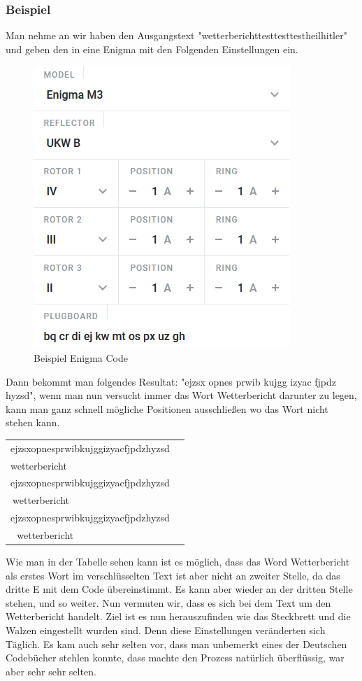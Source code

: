 \subsubsection{Beispiel}
Man nehme an wir haben den Ausgangstext "wetterberichttesttesttestheilhitler" und geben den in eine Enigma mit den Folgenden Einstellungen ein. \begin{figure}
\includegraphics[scale=0.5]{codegen.png}
\caption{Beispiel Enigma Code\cite{encoding}}
\label{fig:ecode}
\end{figure}
Dann bekommt man folgendes Resultat: "ejzsx opnes prwib kujgg izyac fjpdz hyzsd", wenn man nun versucht immer das Wort Wetterbericht darunter zu legen, kann man ganz schnell mögliche Positionen ausschließen wo das Wort nicht stehen kann.
\begin{table}[H]
\begin{tabular}{|l|l|}
\hline
ejzsxopnesprwibkujggizyacfjpdzhyzsd\\
wetterbericht\\
\hline
ejzsxopnesprwibkujggizyacfjpdzhyzsd\\
$\:$wetterbericht\\
\hline
ejzsxopnesprwibkujggizyacfjpdzhyzsd\\
$\:\:\:$wetterbericht\\
\hline
\end{tabular}
\end{table}
Wie man in der Tabelle sehen kann ist es möglich, dass das Word Wetterbericht als erstes Wort im verschlüsselten Text ist aber nicht an zweiter Stelle, da das dritte E mit dem Code übereinstimmt. Es kann aber wieder an der dritten Stelle stehen, und so weiter. Nun vermuten wir, dass es sich bei dem Text um den Wetterbericht handelt. Ziel ist es nun herauszufinden wie das Steckbrett und die Walzen eingestellt wurden sind. Denn diese Einstellungen veränderten sich Täglich. Es kam auch sehr selten vor, dass man unbemerkt eines der Deutschen Codebücher stehlen konnte, dass machte den Prozess natürlich überflüssig, war aber sehr sehr selten.
